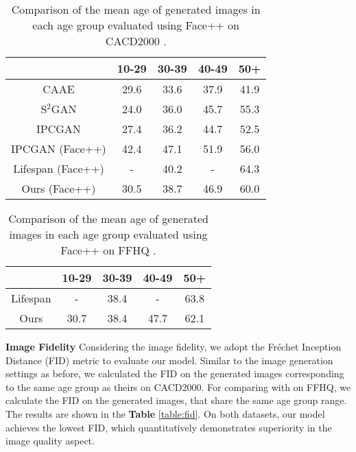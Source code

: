 \documentclass[final]{cvpr}
\begin{document}
\begin{table}[t!]
  \centering
  \begin{tabular}{ccccc}
    \toprule
    & 10-29 & 30-39 & 40-49 & 50+ \\
    \midrule
    CAAE \cite{zhang2017age} & 29.6 & 33.6 & 37.9 & 41.9 \\
    S\(^2\)GAN \cite{he2019s2gan} & 24.0 & 36.0 & 45.7 & 55.3 \\
    IPCGAN \cite{wang2018face} & 27.4 & 36.2 & 44.7 & 52.5 \\
    \midrule
    IPCGAN \cite{wang2018face} (Face++) & 42.4 & 47.1 & 51.9 & 56.0 \\
    Lifespan \cite{orel2020lifespan} (Face++) & - & 40.2 & - & 64.3 \\
    Ours (Face++) & 30.5 & 38.7 & 46.9 & 60.0 \\
    \bottomrule
  \end{tabular}
  \caption{Comparison of the mean age of generated images in each age group evaluated using Face++ on CACD2000 \cite{chen2014cross}.}
    \label{table:age_cacd_table}
\end{table}

\begin{table}[t!]
  \centering
  \begin{tabular}{ccccc}
    \toprule
    & 10-29 & 30-39 & 40-49 & 50+ \\
    \midrule
    Lifespan \cite{orel2020lifespan} & - & 38.4 & - & 63.8 \\
    Ours & 30.7 & 38.4 & 47.7 & 62.1 \\
    \bottomrule
  \end{tabular}
  \caption{Comparison of the mean age of generated images in each age group evaluated using Face++ on FFHQ \cite{karras2019style}.}
    \label{table:age_ffhq_table}
\end{table}
\textbf{Image Fidelity}
Considering the image fidelity, we adopt the Fréchet Inception Distance (FID) \cite{heusel2017gans} metric to evaluate our model. Similar to the image generation settings as before, we calculated the FID on the generated images corresponding to the same age group as theirs on CACD2000. For comparing with \cite{orel2020lifespan} on FFHQ, we calculate the FID on the generated images, that share the same age group range. The results are shown in the \textbf{Table} \ref{table:fid}. On both datasets, our model achieves the lowest FID, which quantitatively demonstrates superiority in the image quality aspect.
\end{document}
